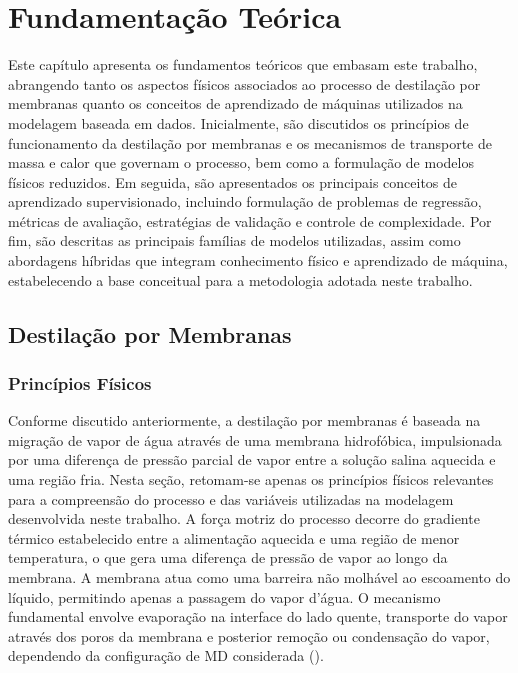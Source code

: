 \chapter{Fundamentação Teórica}

Este capítulo apresenta os fundamentos teóricos que embasam este trabalho, abrangendo tanto os aspectos físicos associados ao processo de destilação por membranas quanto os conceitos de aprendizado de máquinas utilizados na modelagem baseada em dados. Inicialmente, são discutidos os princípios de funcionamento da destilação por membranas e os mecanismos de transporte de massa e calor que governam o processo, bem como a formulação de modelos físicos reduzidos. Em seguida, são apresentados os principais conceitos de aprendizado supervisionado, incluindo formulação de problemas de regressão, métricas de avaliação, estratégias de validação e controle de complexidade. Por fim, são descritas as principais famílias de modelos utilizadas, assim como abordagens híbridas que integram conhecimento físico e aprendizado de máquina, estabelecendo a base conceitual para a metodologia adotada neste trabalho.



\section{Destilação por Membranas}

\subsection{Princípios Físicos}

Conforme discutido anteriormente, a destilação por membranas é baseada na migração de vapor de água através de uma membrana hidrofóbica, impulsionada por uma diferença de pressão parcial de vapor entre a solução salina aquecida e uma região fria. Nesta seção, retomam-se apenas os princípios físicos relevantes para a compreensão do processo e das variáveis utilizadas na modelagem desenvolvida neste trabalho. A força motriz do processo decorre do gradiente térmico estabelecido entre a alimentação aquecida e uma região de menor temperatura, o que gera uma diferença de pressão de vapor ao longo da membrana. A membrana atua como uma barreira não molhável ao escoamento do líquido, permitindo apenas a passagem do vapor d'água. O mecanismo fundamental envolve evaporação na interface do lado quente, transporte do vapor através dos poros da membrana e posterior remoção ou condensação do vapor, dependendo da configuração de MD considerada (\cite{Cath2010, Hitsov2015}).

